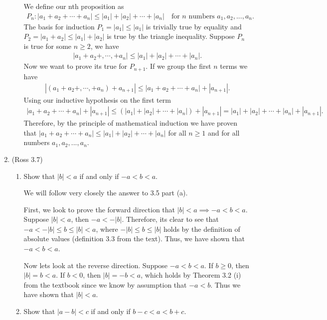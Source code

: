 \documentclass [10pt]{article}
\newcommand{\jg}[1]{{\color{blue} #1}}
\begin{document}
\begin{enumerate}
\begin{enumerate}
\jg{
We define our nth proposition as 
\begin{align*}
    P_n : |a_1+a_2 + \cdots + a_n| \leq |a_1|+|a_2|+ \cdots + |a_n| \quad \text{for $n$ numbers $a_1, a_2, ..., a_n$}.
\end{align*}
The basis for induction $P_1 = |a_1| \leq |a_1|$ is trivially true by equality and $P_2 = |a_1 + a_2| \leq |a_1| + |a_2|$ is true by the triangle inequality. Suppose $P_n$ is true for some $n \geq 2$, we have
\begin{align*}
    |a_1 + a_2 +, \cdots, + a_n| \leq |a_1| + |a_2| + \cdots + |a_n|.
\end{align*}
Now we want to prove its true for $P_{n+1}$. If we group the first $n$ terms we have 
\begin{align*}
    |(a_1 + a_2 +, \cdots, + a_n) + a_{n+1}| \leq |a_1 + a_2 + \cdots + a_n| + |a_{n+1}|. 
\end{align*}
Using our inductive hypothesis on the first term 
\begin{align*}
    |a_1 + a_2 + \cdots + a_n| + |a_{n+1} | \leq (|a_1| + |a_2| + \cdots + |a_n|) + |a_{n+1}| = |a_1| + |a_2| + \cdots + |a_n| + |a_{n+1}|. 
\end{align*}
Therefore, by the principle of mathematical induction we have proven that $|a_1+a_2 + \cdots + a_n| \leq |a_1|+|a_2|+ \cdots + |a_n|$ for all $n \geq 1$ and for all numbers $a_1, a_2, ..., a_n$. 
}
\end{enumerate}
\clearpage
\item (Ross 3.7)
\begin{enumerate}
\item Show that $|b|< a$ if and only if $-a < b < a.$

\jg{
We will follow very closely the answer to 3.5 part (a). 

First, we look to prove the forward direction that $|b| < a \implies -a < b < a$. Suppose $|b| < a$, then $-a < -|b|$. Therefore, its clear to see that $-a < -|b| \leq b \leq |b| < a$, where $-|b| \leq b \leq |b|$ holds by the definition of absolute values (definition 3.3 from the text). Thus, we have shown that $-a < b < a$. 

Now lets look at the reverse direction. Suppose $-a < b < a$. If $b \geq 0$, then $|b| = b < a$. If $b < 0$, then $|b| = -b < a$, which holds by Theorem 3.2 (i) from the textbook since we know by assumption that $-a < b$. Thus we have shown that $|b| < a$. \\
}

\item Show that $|a-b|< c$ if and only if $b-c < a < b+c.$


\end{enumerate}
\end{enumerate}
\end{document}
